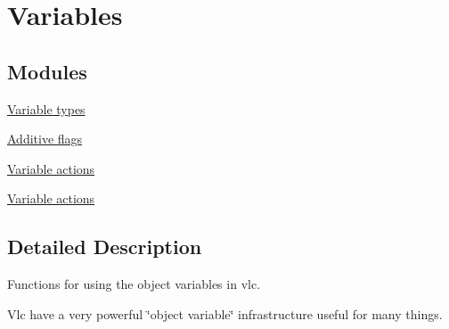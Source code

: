 \hypertarget{group__variables}{}\section{Variables}
\label{group__variables}
\subsection*{Modules}
\begin{DoxyCompactItemize}
\item 
\hyperlink{group__var__type}{Variable types}
\item 
\hyperlink{group__var__flags}{Additive flags}
\item 
\hyperlink{group__var__action}{Variable actions}
\item 
\hyperlink{group__var__GetAndSet}{Variable actions}
\end{DoxyCompactItemize}


\subsection{Detailed Description}
Functions for using the object variables in vlc.

Vlc have a very powerful \char`\"{}object variable\char`\"{} infrastructure useful for many things. 
